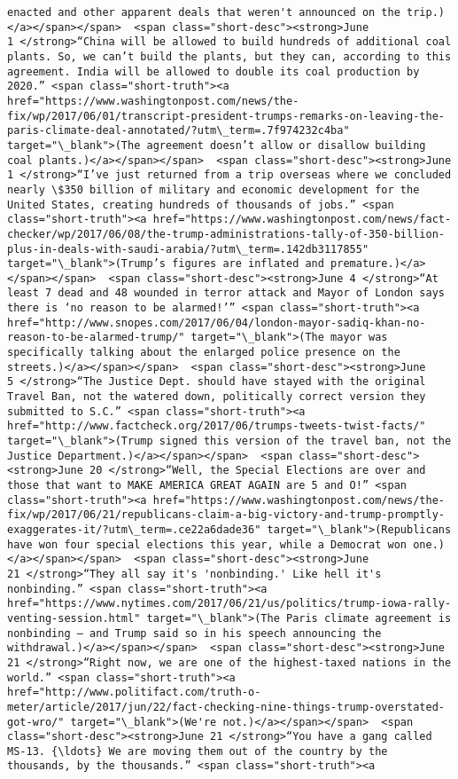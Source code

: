\documentclass[11pt]{article}
\begin{document}
\begin{Verbatim}[commandchars=\\\{\}]
enacted and other apparent deals that weren't announced on the trip.)</a></span></span>  <span class="short-desc"><strong>June 1 </strong>“China will be allowed to build hundreds of additional coal plants. So, we can’t build the plants, but they can, according to this agreement. India will be allowed to double its coal production by 2020.” <span class="short-truth"><a href="https://www.washingtonpost.com/news/the-fix/wp/2017/06/01/transcript-president-trumps-remarks-on-leaving-the-paris-climate-deal-annotated/?utm\_term=.7f974232c4ba" target="\_blank">(The agreement doesn’t allow or disallow building coal plants.)</a></span></span>  <span class="short-desc"><strong>June 1 </strong>“I’ve just returned from a trip overseas where we concluded nearly \$350 billion of military and economic development for the United States, creating hundreds of thousands of jobs.” <span class="short-truth"><a href="https://www.washingtonpost.com/news/fact-checker/wp/2017/06/08/the-trump-administrations-tally-of-350-billion-plus-in-deals-with-saudi-arabia/?utm\_term=.142db3117855" target="\_blank">(Trump’s figures are inflated and premature.)</a></span></span>  <span class="short-desc"><strong>June 4 </strong>“At least 7 dead and 48 wounded in terror attack and Mayor of London says there is ‘no reason to be alarmed!’” <span class="short-truth"><a href="http://www.snopes.com/2017/06/04/london-mayor-sadiq-khan-no-reason-to-be-alarmed-trump/" target="\_blank">(The mayor was specifically talking about the enlarged police presence on the streets.)</a></span></span>  <span class="short-desc"><strong>June 5 </strong>“The Justice Dept. should have stayed with the original Travel Ban, not the watered down, politically correct version they submitted to S.C.” <span class="short-truth"><a href="http://www.factcheck.org/2017/06/trumps-tweets-twist-facts/" target="\_blank">(Trump signed this version of the travel ban, not the Justice Department.)</a></span></span>  <span class="short-desc"><strong>June 20 </strong>“Well, the Special Elections are over and those that want to MAKE AMERICA GREAT AGAIN are 5 and O!” <span class="short-truth"><a href="https://www.washingtonpost.com/news/the-fix/wp/2017/06/21/republicans-claim-a-big-victory-and-trump-promptly-exaggerates-it/?utm\_term=.ce22a6dade36" target="\_blank">(Republicans have won four special elections this year, while a Democrat won one.)</a></span></span>  <span class="short-desc"><strong>June 21 </strong>“They all say it's 'nonbinding.' Like hell it's nonbinding.” <span class="short-truth"><a href="https://www.nytimes.com/2017/06/21/us/politics/trump-iowa-rally-venting-session.html" target="\_blank">(The Paris climate agreement is nonbinding — and Trump said so in his speech announcing the withdrawal.)</a></span></span>  <span class="short-desc"><strong>June 21 </strong>“Right now, we are one of the highest-taxed nations in the world.” <span class="short-truth"><a href="http://www.politifact.com/truth-o-meter/article/2017/jun/22/fact-checking-nine-things-trump-overstated-got-wro/" target="\_blank">(We're not.)</a></span></span>  <span class="short-desc"><strong>June 21 </strong>“You have a gang called MS-13. {\ldots} We are moving them out of the country by the thousands, by the thousands.” <span class="short-truth"><a 
\end{Verbatim}
\end{document}
